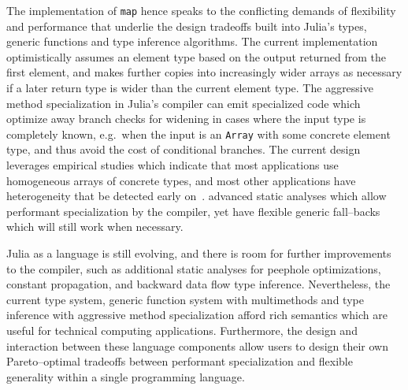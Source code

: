 \documentclass[pldi]{sigplanconf-pldi15}
\begin{document}
The implementation of \verb|map| hence speaks to the conflicting demands of
flexibility and performance that underlie the design tradeoffs built into
Julia's types, generic functions and type inference algorithms. The current
implementation optimistically assumes an element type based on the output
returned from the first element, and makes further copies into increasingly
wider arrays as necessary if a later return type is wider than the current
element type. The aggressive method specialization in Julia's compiler can emit
specialized code which optimize away branch checks for widening in cases where
the input type is completely known, e.g.\ when the input is an \verb|Array|
with some concrete element type, and thus avoid the cost of conditional
branches. The current design leverages empirical studies which indicate that
most applications use homogeneous arrays of concrete types, and most other
applications have heterogeneity that be detected early on~\cite{Bolz2013}.
advanced static analyses which allow performant specialization by the compiler,
yet have flexible generic fall--backs which will still work when necessary.

Julia as a language is still evolving, and there is room for further
improvements to the compiler, such as additional static analyses for peephole
optimizations, constant propagation, and backward data flow type inference.
Nevertheless, the current type system, generic function system with
multimethods and type inference with aggressive method specialization afford
rich semantics which are useful for technical computing applications.
Furthermore, the design and interaction between these language components allow
users to design their own Pareto--optimal tradeoffs between performant
specialization and flexible generality within a single programming language.


\listoftodos %



\end{document}
